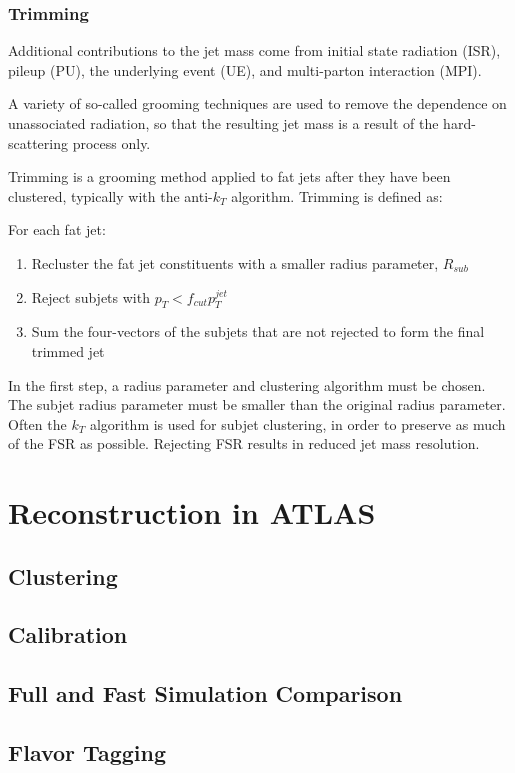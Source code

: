 \subsubsection{Trimming}

Additional contributions to the jet mass come from initial state radiation (ISR),
pileup (PU), the underlying event (UE), and multi-parton interaction (MPI).

A variety of so-called grooming techniques are used to remove the dependence on unassociated radiation,
so that the resulting jet mass is a result of the hard-scattering process only.

Trimming is a grooming method applied to fat jets after they have been clustered, typically with the anti-$k_T$ algorithm.
Trimming is defined as:

For each fat jet:
\begin{enumerate}
    \item Recluster the fat jet constituents with a smaller radius parameter, $R_{sub}$
    \item Reject subjets with $p_{T} < f_{cut} p_T^{jet}$
    \item Sum the four-vectors of the subjets that are not rejected to form the final trimmed jet
\end{enumerate}

In the first step, a radius parameter and clustering algorithm must be chosen.
The subjet radius parameter must be smaller than the original radius parameter.
Often the $k_T$ algorithm is used for subjet clustering, in order to preserve as much of the FSR as possible.
Rejecting FSR results in reduced jet mass resolution.

\section{Reconstruction in ATLAS}\label{sec:jet_reconstruction}
\subsection{Clustering}\label{subsec:jet_clustering}
\subsection{Calibration}\label{subsec:jet_calibration}
\subsection{Full and Fast Simulation Comparison}\label{subsec:jet_full_vs_fast_sim}
\subsection{Flavor Tagging}\label{subsec:jet_flavor_tagging}